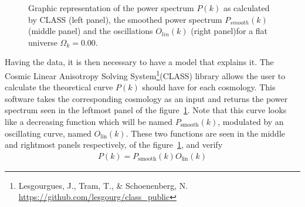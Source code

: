 \begin{figure}[t]
	\centering
	\caption[The template power spectrum, its smooth component and the pure BAO]{Graphic representation of the power spectrum $P(k)$ as calculated by CLASS (left panel), the smoothed power spectrum $P_{smooth}(k)$ (middle panel) and the oscillations $O_{lin}(k)$ (right panel)for a flat universe $\Omega_k = 0.00$.} \label{fig:PkOlPsm} \end{figure} Having the data, it is then necessary to have a model that explains it. The Cosmic Linear Anisotropy Solving System\footnote{Lesgourgues, J., Tram, T., \& Schoenenberg, N. \url{https://github.com/lesgourg/class_public}}(CLASS) \cite{class} library allows the user to calculate the theoretical curve $P(k)$ should have for each cosmology. This software takes the corresponding cosmology as an input and returns the power spectrum seen in the leftmost panel of the figure~\ref{fig:PkOlPsm}. Note that this curve looks like a decreasing function which will be named $P_{\text{smooth}}(k)$, modulated by an oscillating curve, named $O_{\text{lin}}(k)$. These two functions are seen in the middle and rightmost panels respectively, of the figure~\ref{fig:PkOlPsm}, and verify \begin{align} P(k) = P_{\text{smooth}}(k) O_{\text{lin}}(k)
	\label{eq:pk-components}
\end{align}
